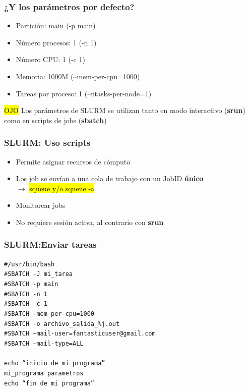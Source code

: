 \documentclass[aspectratio=169,professionalfonts]{beamer}
\begin{document}
\begin{frame}[fragile]
\frametitle{\textbf{¿Y los parámetros por defecto?}}
\begin{itemize}
    \item Partición: main  (-p main)
    \vspace{0.5em}
    \item  Número procesos: 1  (-n 1)
    \vspace{0.5em}
    \item Número CPU: 1 (-c 1)
    \vspace{0.5em}
    \item  Memoria: 1000M (--mem-per-cpu=1000)
    \vspace{0.5em}
    \item Tareas por proceso: 1 (--ntasks-per-node=1)
\end{itemize}
    \hl{OJO} Los parámetros de SLURM se utilizan tanto en modo interactivo (\textbf{srun}) como en scripts de jobs (\textbf{sbatch})
\end{frame}
\begin{frame} [fragile]
\frametitle{\textbf{SLURM: Uso scripts}}
    \begin{itemize}
        \item Permite asignar recursos de cómputo 
         \vspace{0.5em} 
        \item Los job se envían a una cola de trabajo con un JobID \textbf{único} \\ $\rightarrow$ \hl{squeue y/o squeue -a}
         \vspace{0.5em} 
        \item  Monitorear jobs
         \vspace{0.5em} 
        \item No requiere sesión activa, al contrario con \textbf{srun}
    \end{itemize}
\end{frame}


\begin{frame}[fragile]
\frametitle{\textbf{SLURM:Enviar tareas}}
    \texttt{\#\!/usr/bin/bash} \\
\texttt{\#SBATCH -J mi\_tarea} \\
\texttt{\#SBATCH -p main} \\
\texttt{\#SBATCH -n 1} \\
\texttt{\#SBATCH -c 1} \\
\texttt{\#SBATCH --mem-per-cpu=1000} \\
\texttt{\#SBATCH -o archivo\_salida\_\%j.out} \\
\texttt{\#SBATCH --mail-user=fantasticuser@gmail.com} \\
\texttt{\#SBATCH --mail-type=ALL} \\
\\
\texttt{echo ``inicio de mi programa''} \\
\texttt{mi\_programa parametros} \\
\texttt{echo ``fin de mi programa''} \\
\end{frame}
    
\end{document}
